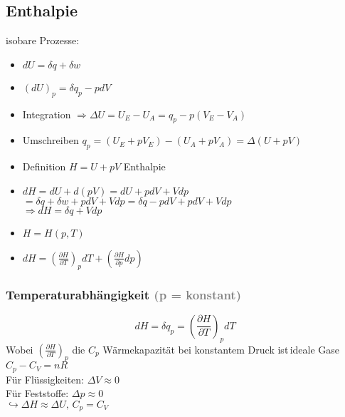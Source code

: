 \documentclass[a4paper]{article}
\begin{document}
\subsection{Enthalpie}
isobare Prozesse:
\begin{itemize}
    \item $dU = \delta q + \delta w$
    \item $(dU)_p = \delta q_p - p d V$
    \item Integration $ \Rightarrow \Delta U = U_E - U_A = q_p - p (V_E - V_A)$
    \item Umschreiben $q_p = ( U_E + pV_E ) - ( U_A + pV_A) = \Delta (U+pV)$
    \item Definition $H = U + pV$ Enthalpie
    \item $dH = dU + d(pV) = dU + pdV + Vdp$\\$= \delta q + \delta w + pdV + Vdp = \delta q - pdV + pdV + Vdp$\\$\Rightarrow dH = \delta q + Vdp$
    \item $H = H(p,T)$
    \item $dH = \left(\frac{\partial H}{\partial T}\right)_p dT + \left(\frac{\partial H}{\partial p} dp\right)$
\end{itemize}

\subsubsection{Temperaturabhängigkeit \textcolor{gray}{(p = konstant)}}
\begin{equation*}
    dH = \delta q_p = \left(\frac{\partial H}{\partial T}\right)_p dT
\end{equation*}
Wobei $\left(\frac{\partial H}{\partial T}\right)_p$ die $C_p$ Wärmekapazität bei konstantem Druck ist\,ideale Gase $C_p - C_V = nR$\\
Für Flüssigkeiten: $\Delta V \approx 0$\\
Für Feststoffe: $\Delta p \approx 0$\\
$\hookrightarrow \Delta H \approx \Delta U,\, C_p = C_V$
\end{document}
